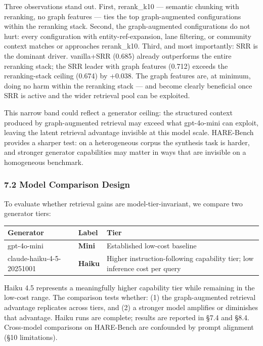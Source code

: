 Three observations stand out. First, rerank\_k10 --- semantic chunking with reranking, no graph features --- ties the top graph-augmented configurations within the reranking stack. Second, the graph-augmented configurations do not hurt: every configuration with entity-ref-expansion, lane filtering, or community context matches or approaches rerank\_k10. Third, and most importantly: SRR is the dominant driver. vanilla+SRR (0.685) already outperforms the entire reranking stack; the SRR leader with graph features (0.712) exceeds the reranking-stack ceiling (0.674) by +0.038. The graph features are, at minimum, doing no harm within the reranking stack --- and become clearly beneficial once SRR is active and the wider retrieval pool can be exploited.

This narrow band could reflect a generator ceiling: the structured context produced by graph-augmented retrieval may exceed what gpt-4o-mini can exploit, leaving the latent retrieval advantage invisible at this model scale. HARE-Bench provides a sharper test: on a heterogeneous corpus the synthesis task is harder, and stronger generator capabilities may matter in ways that are invisible on a homogeneous benchmark.

\subsubsection{7.2 Model Comparison Design}\label{model-comparison-design}

To evaluate whether retrieval gains are model-tier-invariant, we compare two generator tiers:

\begin{small}
\setlength{\tabcolsep}{4pt}
\begin{longtable}{p{1.8in}p{0.8in}p{3.5in}}
\toprule
\textbf{Generator} & \textbf{Label} & \textbf{Tier} \\
\midrule
\endhead
gpt-4o-mini & \textbf{Mini} & Established low-cost baseline \\
claude-haiku-4-5-20251001 & \textbf{Haiku} & Higher instruction-following capability tier; low inference cost per query \\
\bottomrule
\end{longtable}
\end{small}

Haiku 4.5 represents a meaningfully higher capability tier while remaining in the low-cost range. The comparison tests whether: (1) the graph-augmented retrieval advantage replicates across tiers, and (2) a stronger model amplifies or diminishes that advantage. Haiku runs are complete; results are reported in §7.4 and §8.4. Cross-model comparisons on HARE-Bench are confounded by prompt alignment (§10 limitations).

